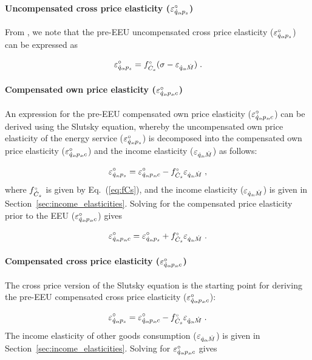\documentclass[12pt]{article}\usepackage[]{graphicx}\usepackage[]{xcolor}
\begin{document}
\paragraph{Uncompensated cross price elasticity ($\eqopsUCorig$)} 

From \citet{Hicks1934}, 
we note that the pre-EEU uncompensated cross price elasticity ($\eqopsUCorig$)
can be expressed as

\begin{equation} \label{eq:Allen}
  \eqopsUCorig = \fCs (\sigma - \eqoM) \; .
\end{equation}


\paragraph{Compensated own price elasticity ($\eqspsCorig$)} 

An expression for the pre-EEU compensated own price elasticity ($\eqspsCorig$)
can be derived using the Slutsky equation, 
whereby the uncompensated own price elasticity 
of the energy service ($\eqspsUCorig$) 
is decomposed into the compensated own price elasticity ($\eqspsCorig$) and
the income elasticity ($\eqsM$) as follows:

\begin{equation} \label{eq:slutsky}
  \eqspsUCorig = \eqspsCorig - \fCs \eqsM \; ,
\end{equation}
%
where $\fCs$ is given by Eq.~(\ref{eq:fCs}), and 
the income elasticity ($\eqsM$) is given in Section~\ref{sec:income_elasticities}.
Solving for the compensated price elasticity prior to the EEU ($\eqspsCorig$) gives

\begin{equation} \label{eq:eqsps}
  \eqspsCorig = \eqspsUCorig + \fCs \eqsM \; .
\end{equation}


\paragraph{Compensated cross price elasticity ($\eqopsCorig$)} 

The cross price version of the Slutsky equation is the starting point
for deriving the pre-EEU compensated cross price elasticity ($\eqopsCorig$):

\begin{equation} \label{eq:slutsky_cross}
  \eqopsUCorig = \eqopsCorig - \fCs \eqoM \; .
\end{equation}
%
The income elasticity of other goods consumption ($\eqoM$) 
is given in Section~\ref{sec:income_elasticities}.
Solving for $\eqopsCorig$ gives
\end{document}
